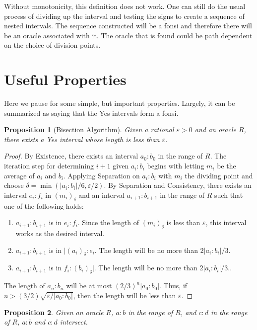 \documentclass[12pt]{article}
\newtheorem{proposition}{Proposition}[section]
\begin{document}
Without monotonicity, this definition does not work. One can still do the usual process of dividing up the interval and testing the signs to create a sequence of nested intervals. The sequence constructed will be a fonsi and therefore there will be an oracle associated with it. The oracle that is found could be path dependent on the choice of division points. 

\section{Useful Properties}

Here we pause for some simple, but important properties. Largely, it can be summarized as saying that the Yes intervals form a fonsi. 

\begin{proposition}[Bisection Algorithm]
    Given a rational $\varepsilon >0$ and an oracle $R$, there exists a Yes interval whose length is less than $\varepsilon$.
\end{proposition}

\begin{proof}
    By Existence, there exists an interval $a_0:b_0$ in the range of $R$. The iteration step for determining $i+1$ given $a_i:b_i$ begins with letting $m_i$ be the average of $a_i$ and $b_i$. Applying Separation on $a_i:b_i$ with $m_i$ the dividing point and choose $\delta = \min(|a_i:b_i|/6, \varepsilon /2)$. By Separation and Consistency, there exists an interval $e_i:f_i$ in $(m_i)_\delta$ and an interval $a_{i+1}:b_{i+1}$ in the range of $R$ such that one of the following holds: 
    \begin{enumerate}
        \item $a_{i+1}:b_{i+1}$ is in $e_i:f_i$. Since the length of $(m_i)_\delta$ is less than $\varepsilon$, this interval works as the desired interval.  
        \item  $a_{i+1}:b_{i+1}$ is in $|(a_i)_\delta:e_i$. The length will be no more than $2|a_i:b_i|/3$.
        \item  $a_{i+1}:b_{i+1}$ is in $f_i:(b_i)_\delta|$. The length will be no more than $2|a_i:b_i|/3$..
    \end{enumerate}
    The length of $a_n:b_n$ will be at most $(2/3)^n |a_0:b_0|$. Thus, if $n > (3/2)\sqrt{\varepsilon/|a_0:b_0|}$, then the length will be less than $\varepsilon$. 
\end{proof}


\begin{proposition}
    Given an oracle $R$, $a:b$ in the range of $R$, and $c:d$ in the range of $R$, $a:b$ and $c:d$ intersect. 
\end{proposition}
\end{document}
